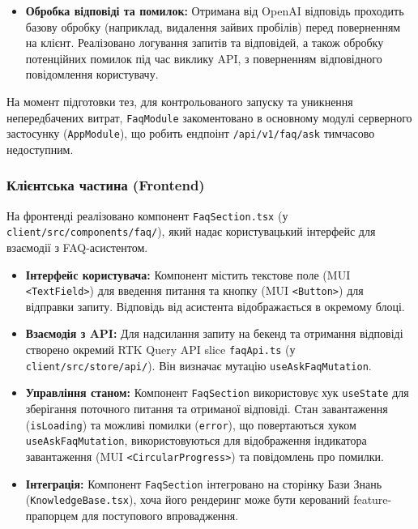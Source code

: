 \begin{itemize}
    \item \textbf{Обробка відповіді та помилок:} Отримана від OpenAI відповідь проходить базову обробку (наприклад, видалення зайвих пробілів) перед поверненням на клієнт. Реалізовано логування запитів та відповідей, а також обробку потенційних помилок під час виклику API, з поверненням відповідного повідомлення користувачу.

\end{itemize}
На момент підготовки тез, для контрольованого запуску та уникнення непередбачених витрат, \texttt{FaqModule} закоментовано в основному модулі серверного застосунку (\texttt{AppModule}), що робить ендпоінт \texttt{/api/v1/faq/ask} тимчасово недоступним.

\subsubsection{Клієнтська частина (Frontend)}
На фронтенді реалізовано компонент \texttt{FaqSection.tsx} (у \texttt{client/src/components/faq/}), який надає користувацький інтерфейс для взаємодії з FAQ-асистентом. 
\begin{itemize}
    \item \textbf{Інтерфейс користувача:} Компонент містить текстове поле (MUI \texttt{<TextField>}) для введення питання та кнопку (MUI \texttt{<Button>}) для відправки запиту. Відповідь від асистента відображається в окремому блоці.
    \item \textbf{Взаємодія з API:} Для надсилання запиту на бекенд та отримання відповіді створено окремий RTK Query API slice \texttt{faqApi.ts} (у \texttt{client/src/store/api/}). Він визначає мутацію \texttt{useAskFaqMutation}.
    \item \textbf{Управління станом:} Компонент \texttt{FaqSection} використовує хук \texttt{useState} для зберігання поточного питання та отриманої відповіді. Стан завантаження (\texttt{isLoading}) та можливі помилки (\texttt{error}), що повертаються хуком \texttt{useAskFaqMutation}, використовуються для відображення індикатора завантаження (MUI \texttt{<CircularProgress>}) та повідомлень про помилки.
    \item \textbf{Інтеграція:} Компонент \texttt{FaqSection} інтегровано на сторінку Бази Знань (\texttt{KnowledgeBase.tsx}), хоча його рендеринг може бути керований feature-прапорцем для поступового впровадження.
\end{itemize}

